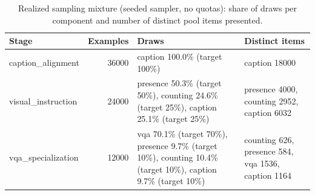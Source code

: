\begin{table}[t]
\centering
\small
\caption{Realized sampling mixture (seeded sampler, no quotas): share of draws per component and number of distinct pool items presented.}
\label{tab:t2_t13_training_mixture_compress49}
\begin{tabular}{lrll}
\toprule
Stage & Examples & Draws & Distinct items \\
\midrule
caption\_alignment & 36000 & caption 100.0\% (target 100\%) & caption 18000 \\
visual\_instruction & 24000 & presence 50.3\% (target 50\%), counting 24.6\% (target 25\%), caption 25.1\% (target 25\%) & presence 4000, counting 2952, caption 6032 \\
vqa\_specialization & 12000 & vqa 70.1\% (target 70\%), presence 9.7\% (target 10\%), counting 10.4\% (target 10\%), caption 9.7\% (target 10\%) & counting 626, presence 584, vqa 1536, caption 1164 \\
\bottomrule
\end{tabular}
\end{table}

